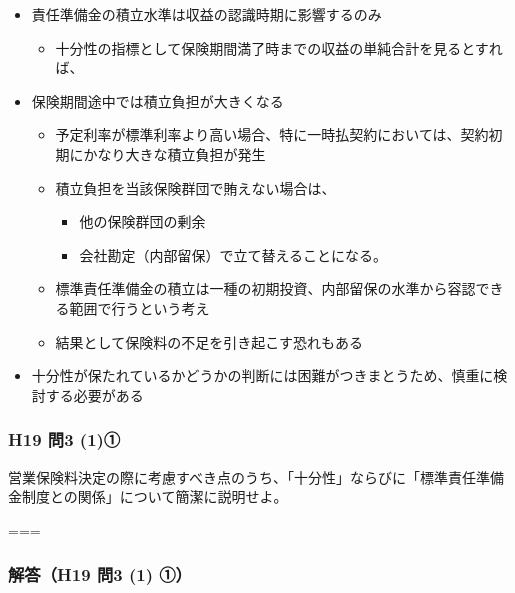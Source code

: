 \documentclass[]{article}
\begin{document}
\begin{enumerate}
\begin{itemize}
    \begin{itemize}
    \tightlist
    \item
      責任準備金の積立水準は収益の認識時期に影響するのみ

      \begin{itemize}
      \tightlist
      \item
        十分性の指標として保険期間満了時までの収益の単純合計を見るとすれば、
      \end{itemize}
    \item
      保険期間途中では積立負担が大きくなる

      \begin{itemize}
      \tightlist
      \item
        予定利率が標準利率より高い場合、特に一時払契約においては、契約初期にかなり大きな積立負担が発生
      \item
        積立負担を当該保険群団で賄えない場合は、

        \begin{itemize}
        \tightlist
        \item
          他の保険群団の剰余
        \item
          会社勘定（内部留保）で立て替えることになる。
        \end{itemize}
      \item
        標準責任準備金の積立は一種の初期投資、内部留保の水準から容認できる範囲で行うという考え
      \item
        結果として保険料の不足を引き起こす恐れもある
      \end{itemize}
    \item
      十分性が保たれているかどうかの判断には困難がつきまとうため、慎重に検討する必要がある
    \end{itemize}
  \end{itemize}
\end{enumerate}

\hypertarget{h19-ux554f3-1ux2460}{%
\subsubsection{H19 問3 (1)①}\label{h19-ux554f3-1ux2460}}

営業保険料決定の際に考慮すべき点のうち、「十分性」ならびに「標準責任準備金制度との関係」について簡潔に説明せよ。

===

\hypertarget{ux89e3ux7b54h19-ux554f3-1-ux2460}{%
\subsubsection{解答（H19 問3 (1)
①）}\label{ux89e3ux7b54h19-ux554f3-1-ux2460}}
\end{document}
